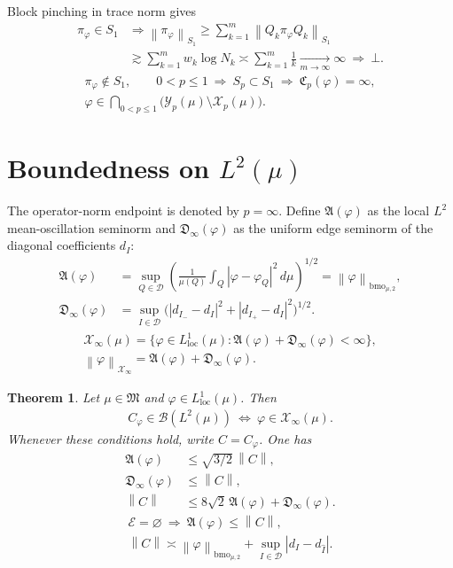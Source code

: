 \documentclass[11pt]{amsart}
\newtheorem{theorem}{Theorem}
\newcommand{\D}{\mathcal D}
\newcommand{\X}{\mathcal X}
\newcommand{\Y}{\mathcal Y}
\newcommand{\norm}[1]{\left\|#1\right\|}
\begin{document}
Block pinching in trace norm gives
\begin{align*}
 \pi_\varphi\in S_1
 &\Longrightarrow
 \norm{\pi_\varphi}_{S_1}
   \ge\sum_{k=1}^m\norm{Q_k\pi_\varphi Q_k}_{S_1}\\
 &\gtrsim\sum_{k=1}^m w_k\log N_k
   \asymp\sum_{k=1}^m\frac1k\xrightarrow[m\to\infty]{}\infty
 \ \Longrightarrow\ \bot.
\end{align*}
\begin{gather*}
 \pi_\varphi\notin S_1,\qquad
 0<p\le1\ \Longrightarrow\ S_p\subset S_1
 \ \Longrightarrow\
 \mathfrak C_p(\varphi)=\infty,\\
 \varphi\in\bigcap_{0<p\le1}\big(\Y_p(\mu)\setminus\X_p(\mu)\big).
\end{gather*}

\section{Boundedness on \texorpdfstring{$L^2(\mu)$}{L2(mu)}}
The operator-norm endpoint is denoted by $p=\infty$. Define
$\mathfrak A(\varphi)$ as the local $L^2$ mean-oscillation seminorm
and $\mathfrak D_\infty(\varphi)$ as the uniform edge seminorm of the
diagonal coefficients $d_I$:
\begin{align}
 \mathfrak A(\varphi)
  &=\sup_{Q\in\D}\left(\frac1{\mu(Q)}
                \int_Q|\varphi-\varphi_Q|^2\,d\mu\right)^{1/2}
    =\norm{\varphi}_{\mathrm{bmo}_{\mu,2}},\label{local-bmo}\\
 \mathfrak D_\infty(\varphi)
  &=\sup_{I\in\D}
       \big(|d_{I_-}-d_I|^2+|d_{I_+}-d_I|^2\big)^{1/2}.
       \label{edge-infty}
\end{align}
\begin{gather*}
 \X_\infty(\mu)=\{\varphi\in L^1_{\mathrm{loc}}(\mu):
       \mathfrak A(\varphi)+\mathfrak D_\infty(\varphi)<\infty\},\\
 \norm{\varphi}_{\X_\infty}
          =\mathfrak A(\varphi)+\mathfrak D_\infty(\varphi).
\end{gather*}
\begin{theorem}\label{boundedness}
Let $\mu\in\mathfrak M$ and $\varphi\in L^1_{\mathrm{loc}}(\mu)$. Then
\begin{gather*}
 C_\varphi\in\mathcal B(L^2(\mu))
       \ \Longleftrightarrow\ \varphi\in\X_\infty(\mu).
\end{gather*}
Whenever these conditions hold, write $C=C_\varphi$. One has
\begin{align}
 \mathfrak A(\varphi)&\le\sqrt{3/2}\,\norm C,
                                          \label{A-lower}\\
 \mathfrak D_\infty(\varphi)&\le\norm C,
                                          \label{D-lower}\\
 \norm C&\le8\sqrt2\,\mathfrak A(\varphi)+\mathfrak D_\infty(\varphi).
                                          \label{bounded-upper}
\end{align}
\begin{gather*}
 \mathscr E=\varnothing\ \Longrightarrow\ \mathfrak A(\varphi)\le\norm C,\\
 \norm C\asymp\norm{\varphi}_{\mathrm{bmo}_{\mu,2}}
                      +\sup_{I\in\D}|d_I-d_{\widehat I}|.
\end{gather*}
\end{theorem}
\end{document}
